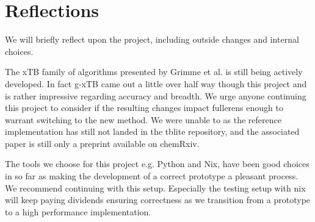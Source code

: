 \chapter{Reflections}\label{sec:reflection}
We will briefly reflect upon the project, including outside changes and internal choices.

The xTB family of algorithms presented by Grimme et al. is still being actively developed. In fact g-xTB came out a little over half way though this project and is rather impressive regarding accuracy and breadth. We urge anyone continuing this project to consider if the resulting changes impact fullerens enough to warrant switching to the new method. We were unable to as the reference implementation has still not landed in the tblite repository, and the associated paper is still only a preprint available on chemRxiv. 

The tools we choose for this project e.g. Python and Nix, have been good choices in so far as making the development of a correct prototype a pleasant process. We recommend continuing with this setup. Especially the testing setup with nix will keep paying dividends ensuring correctness as we transition from a prototype to a high performance implementation.
